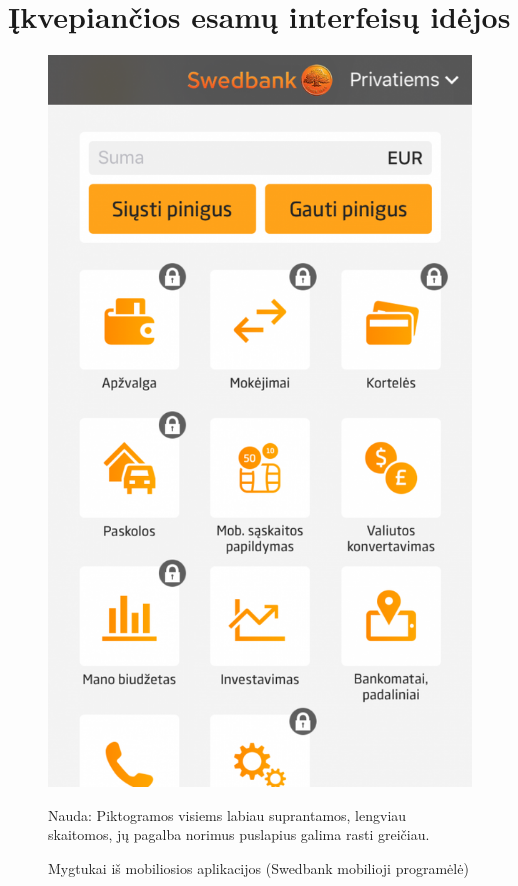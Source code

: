 \documentclass{VUMIFPSkursinis}
\begin{document}
\section{Įkvepiančios esamų interfeisų idėjos}
\begin{figure}[!htb]
	\begin{center}
	\includegraphics[scale=0.4]{mobileApp.png}
	\end{center}
  \caption{Mygtukai iš mobiliosios aplikacijos (Swedbank mobilioji programėlė)}
	\label{fig:mobileApp}
	Nauda: Piktogramos visiems labiau suprantamos, lengviau skaitomos, jų pagalba norimus puslapius galima rasti greičiau.
\end{figure}
\end{document}
